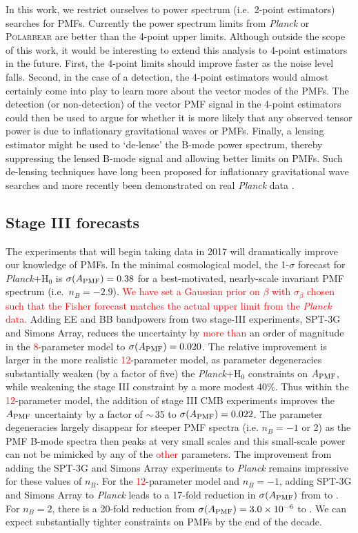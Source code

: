\documentclass[apj]{emulateapj}
\newcommand{\apmf}{\ensuremath{A_{\rm PMF}}}
\newcommand{\ho}{H\ensuremath{_0}}
\newcommand{\planck}{{\sl Planck}}
\newcommand{\sptnew}{SPT-3G}
\newcommand{\pb}{\textsc{Polarbear}}
\newcommand{\simons}{Simons Array}
\newcommand{\changed}[1]{\textcolor{Red}{#1}}
\begin{document}
In this work, we restrict ourselves to power spectrum (i.e.~2-point estimators) searches for PMFs. 
Currently the power spectrum limits from \planck{} or \pb{} are better than the 4-point upper limits. 
Although outside the scope of this work, it would be interesting to extend this analysis to 4-point estimators in the future. 
First, the 4-point limits should improve faster as the noise level falls. 
Second, in the case of a detection, the 4-point estimators would almost certainly come into play to learn more about the vector modes of the PMFs. 
The detection (or non-detection) of the vector PMF signal in the 4-point estimators could then be used to argue for whether it is more likely that any observed tensor power is due to  inflationary gravitational waves or  PMFs. 
Finally, a lensing estimator might be used to `de-lense' the B-mode power spectrum, thereby suppressing the lensed B-mode signal and allowing better limits on PMFs. 
Such de-lensing techniques have long been proposed for inflationary gravitational wave searches \citep[e.g.][]{knox02,kesden02,seljak04a,simard15} and more recently been demonstrated on real \planck{} data \citep{larsen16}. 


\subsection{Stage III forecasts}

The experiments that will begin taking data in 2017 will dramatically improve our knowledge of PMFs. 
In the minimal cosmological model, the 1-$\sigma$ forecast for \planck{}+\ho{} is $\sigma(\apmf)=\fisherAplk$ for a best-motivated, nearly-scale invariant PMF spectrum (i.e.~$n_B=-2.9$). 
\changed{We have set a Gaussian prior on $\beta$ with $\sigma_\beta$ chosen such that the Fisher forecast matches the actual upper limit from the \planck{} data.  }
Adding  EE and BB bandpowers from two stage-III experiments, \sptnew{} and \simons{}, reduces the uncertainty by \changed{more than} an order of magnitude in the \changed{8}-parameter model to $\sigma(\apmf)=\fisherASThree$. 
The relative improvement is larger in the more realistic \changed{12}-parameter model, as parameter degeneracies substantially weaken (by a factor of five) the \planck+\ho{} constraints on \apmf{}, while weakening the stage III constraint by a  more modest 40\%. 
Thus within the \changed{12}-parameter model,  the addition of stage III CMB experiments improves the \apmf{} uncertainty by a factor of $\sim$\,35 to  $\sigma(\apmf)=\fisherAlooseSThree$. 
The parameter degeneracies largely disappear for steeper PMF spectra (i.e. $n_B=-1$ or 2) as the PMF B-mode spectra then peaks at very small scales and this small-scale power can not be mimicked by any of the \changed{other} parameters. 
The improvement from adding the SPT-3G and Simons Array experiments to \planck{} remains impressive for these values of $n_B$.
For the \changed{12}-parameter model and $n_B=-1$, adding SPT-3G and Simons Array to \planck{} leads to a 17-fold reduction in $\sigma(\apmf)$ from \fisherAlooseNbOneplk{} to \fisherAlooseNbOneSThree{}.
For $n_B=2$, there is a 20-fold reduction from $\sigma(\apmf) = \fisherAlooseNbTwoplk$ to  \fisherAlooseNbTwoSThree. 
We can expect substantially tighter constraints on PMFs by the end of the decade. 
\end{document}
